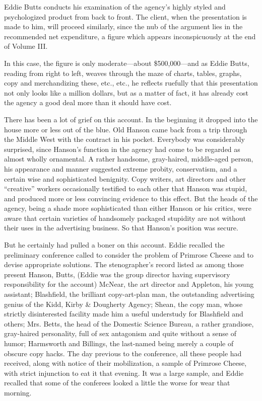 \documentclass[twoside,nohyper,openany,nobib]{tufte-book}
\begin{document}
Eddie Butts conducts his examination of the agency's highly styled and
psychologized product from back to front. The client, when the
presentation is made to him, will proceed similarly, since the nub of
the argument lies in the recommended net expenditure, a figure which
appears inconspicuously at the end of Volume III.

In this case, the figure is only moderate---about \$500,000---and as
Eddie Butts, reading from right to left, weaves through the maze of
charts, tables, graphs, copy and merchandizing these, etc., etc., he
reflects ruefully that this presentation not only looks like a million
dollars, but as a matter of fact, it has already cost the agency a good
deal more than it should have cost.

There has been a lot of grief on this account. In the beginning it
dropped into the house more or less out of the blue. Old Hanson came
back from a trip through the Middle West with the contract in his
pocket. Everybody was considerably surprised, since Hanson's function in
the agency had come to be regarded as almost wholly ornamental. A rather
handsome, gray-haired, middle-aged person, his appearance and manner
suggested extreme probity, conservatism, and a certain wise and
sophisticated benignity. Copy writers, art directors and other
``creative'' workers occasionally testified to each other that Hanson
was stupid, and produced more or less convincing evidence to this
effect. But the heads of the agency, being a shade more sophisticated
than either Hanson or his critics, were aware that certain varieties of
handsomely packaged stupidity are not without their uses in the
advertising business. So that Hanson's position was secure.

But he certainly had pulled a boner on this account. Eddie recalled the
preliminary conference called to consider the problem of Primrose Cheese
and to devise appropriate solutions.
\enlargethispage{\baselineskip}
The stenographer's record listed as among those present Hanson, Butts,
(Eddie was the group director having supervisory responsibility for the
account) McNear, the art director and Appleton, his young assistant;
Blashfield, the brilliant copy-art-plan man, the outstanding advertising
genius of the Kidd, Kirby \& Dougherty Agency; Shean, the copy man,
whose strictly disinterested facility made him a useful understudy for
Blashfield and others; Mrs. Betts, the head of the Domestic Science
Bureau, a rather grandiose, gray-haired personality, full of sex
antagonism and quite without a sense of humor; 
Harmsworth and Billings,
the last-named being merely a couple of obscure copy hacks.
\clearpage
The day previous to the conference, all these people had received, along
with notice of their mobilization, a sample of Primrose Cheese, with
strict injunction to eat it that evening. It was a large sample, and
Eddie recalled that some of the conferees looked a little the worse for
wear that morning.
\end{document}
